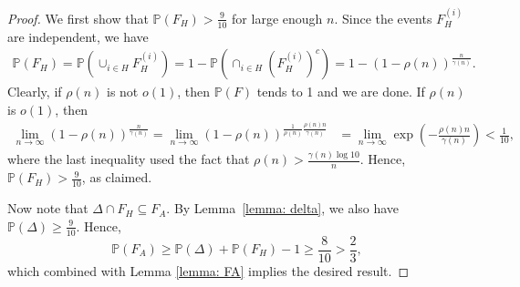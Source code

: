\begin{proof}

We first show that $\mathbb P(F_H) > \frac{9}{10}$ for large enough $n$. 
Since the events $F_H^{(i)}$ are independent, we have
\begin{align*}
\mathbb P(F_H) = \mathbb P \left( \cup_{i \in H} F_H^{(i)} \right) = 1 - \mathbb P \left(  \cap_{i \in H} \left(F_H^{(i)}\right)^c \right) = 1 - (1-\rho(n))^{\frac{n}{\gamma(n)}}.
\end{align*}
Clearly, if $\rho(n)$ is not $o(1)$, then $\mathbb P(F)$ tends to 1 and we are done. If $\rho(n)$ is $o(1)$, then
\begin{align*}
\lim_{n \to \infty} (1-\rho(n))^{\frac{n}{\gamma(n)}} = \lim_{n \to \infty} (1-\rho(n))^{\frac{1}{\rho(n)} \frac{\rho(n)n}{\gamma(n)}} &= \lim_{n \to \infty} \exp \left(- \frac{\rho(n)n}{\gamma(n)} \right) < \frac{1}{10},
\end{align*}
where the last inequality used the fact that $\rho(n) > \frac{\gamma(n)\log 10}{n}$. Hence, $\mathbb P(F_H) > \frac{9}{10}$, as claimed.

Now note that $\Delta \cap F_H \subseteq F_A$. By Lemma~\ref{lemma: delta}, we also have $\mathbb P(\Delta) \ge \frac{9}{10}$. Hence,
$$\mathbb P(F_A) \geq \mathbb P(\Delta) + \mathbb P(F_H) - 1 \geq \frac{8}{10} > \frac{2}{3},$$
which combined with Lemma \ref{lemma: FA} implies the desired result.
\end{proof}

